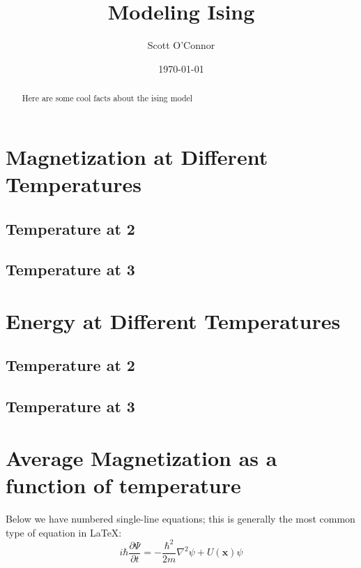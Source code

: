 \documentclass[]{article}
\begin{document}
\title{Modeling Ising}%
\author{Scott O'Connor}
\date{\today}%
\maketitle

\begin{abstract}
Here are some cool facts about the ising model 
\end{abstract}


\section{Magnetization at Different Temperatures} %
\label{sec:level1} %

\subsection{\label{sec:level2} Temperature at 2}

\subsection{\label{sec:level2} Temperature at 3}

\section{Energy at Different Temperatures}

\subsection{\label{sec:level2} Temperature at 2}

\subsection{\label{sec:level2} Temperature at 3}

\section{Average Magnetization as a function of temperature}

Below we have numbered single-line equations; this is generally the most common type of equation in \LaTeX: 
\begin{equation} 
\label{eq:one} %
  i \hbar \frac{\partial \Psi}{\partial t} = -\frac{\hbar^2}{2m}\nabla^2 \psi + U(\mathbf{x}) \psi
\end{equation}
\end{document}
